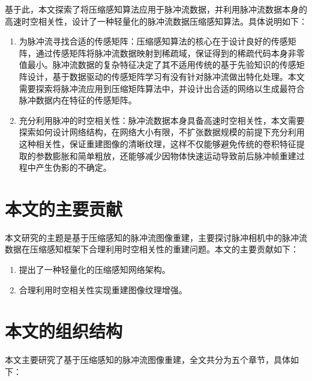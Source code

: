 基于此，本文探索了将压缩感知算法应用于脉冲流数据，并利用脉冲流数据本身的高速时空相关性，设计了一种轻量化的脉冲流数据压缩感知算法。具体说明如下：
\begin{enumerate}
  \item 为脉冲流寻找合适的传感矩阵：压缩感知算法的核心在于设计良好的传感矩阵，通过传感矩阵将脉冲流数据映射到稀疏域，保证得到的稀疏代码本身非零值最小。脉冲流数据的复杂特征决定了其不适用传统的基于先验知识的传感矩阵设计，基于数据驱动的传感矩阵学习有没有针对脉冲流做出特化处理。本文需要探索将脉冲流应用到压缩矩阵算法中，并设计出合适的网络以生成最符合脉冲数据内在特征的传感矩阵。
  \item 充分利用脉冲的时空相关性：脉冲流数据本身具备高速时空相关性，本文需要探索如何设计网络结构，在网络大小有限，不扩张数据规模的前提下充分利用这种相关性，保证重建图像的清晰纹理，这样不仅能够避免传统的卷积特征提取的参数膨胀和简单粗放，还能够减少因物体快速运动导致前后脉冲帧重建过程中产生伪影的不确定。
\end{enumerate}

\section{本文的主要贡献}

本文研究的主题是基于压缩感知的脉冲流图像重建，主要探讨脉冲相机中的脉冲流数据在压缩感知框架下合理利用时空相关性的重建问题。本文的主要贡献如下：
\begin{enumerate}
  \item 提出了一种轻量化的压缩感知网络架构。
  \item 合理利用时空相关性实现重建图像纹理增强。
\end{enumerate}

\section{本文的组织结构}
本文主要研究了基于压缩感知的脉冲流图像重建，全文共分为五个章节，具体如下：






